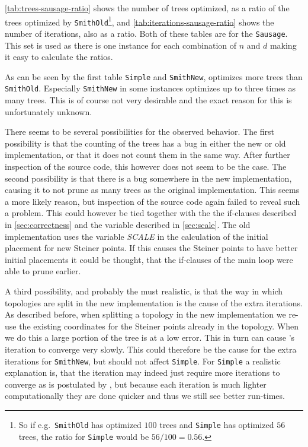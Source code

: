 \cref{tab:trees-sausage-ratio} shows the number of trees optimized, as a ratio
of the trees optimized by \texttt{SmithOld}\footnote{So if e.g.\
  \texttt{SmithOld} has optimized $100$ trees and \texttt{Simple} has optimized
$56$ trees, the ratio for \texttt{Simple} would be $56/100 = 0.56$.}, and
\cref{tab:iterations-sausage-ratio} shows the number of iterations, also as a
ratio. Both of these tables are for the \texttt{Sausage}. This set is used as
there is one instance for each combination of $n$ and $d$ making it easy to
calculate the ratios.

As can be seen by the first table \texttt{Simple} and \texttt{SmithNew},
optimizes more trees than \texttt{SmithOld}. Especially \texttt{SmithNew} in
some instances optimizes up to three times as many trees. This is of course not
very desirable and the exact reason for this is unfortunately unknown.

There seems to be several possibilities for the observed behavior. The first
possibility is that the counting of the trees has a bug in either the new or old
implementation, or that it does not count them in the same way. After further
inspection of the source code, this however does not seem to be the case. The
second possibility is that there is a bug somewhere in the new implementation,
causing it to not prune as many trees as the original implementation. This seems
a more likely reason, but inspection of the source code again failed to reveal
such a problem. This could however be tied together with the the if-clauses
described in \cref{sec:correctness} and the variable described in
\cref{sec:scale}. The old implementation uses the variable \textit{SCALE} in the
calculation of the initial placement for new Steiner points. If this causes the
Steiner points to have better initial placements it could be thought, that the
if-clauses of the main loop were able to prune earlier.

A third possibility, and probably the must realistic, is that the way in which
topologies are split in the new implementation is the cause of the extra
iterations. As described before, when splitting a topology in the new
implementation we re-use the existing coordinates for the Steiner points already
in the topology. When we do this a large portion of the tree is at a low error.
This in turn can cause \citeauthor{smith1992}'s iteration to converge very
slowly. This could therefore be the cause for the extra iterations for
\texttt{SmithNew}, but should not affect \texttt{Simple}. For \texttt{Simple} a
realistic explanation is, that the iteration may indeed just require more
iterations to converge as is postulated by \textcite{smith1992}, but because
each iteration is much lighter computationally they are done quicker and thus we
still see better run-times.

